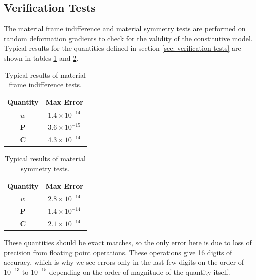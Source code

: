\documentclass[]{spie}  %
\newcommand\Tstrut{\rule{0pt}{2.6ex}}         %
\begin{document}
\subsection{Verification Tests}
The material frame indifference and material symmetry tests are performed on random deformation gradients to check for the validity of the constitutive model. Typical results for the quantities defined in section \ref{sec: verification tests} are shown in tables \ref{table: material frame indifference} and \ref{table: material symmetry}.

\begin{table}[h]
	\centering
	\caption{Typical results of material frame indifference tests.}
	\begin{tabular}{ | c | c | }
		\hline
		Quantity & Max Error \Tstrut \\ \hline
		$w$ 		& $1.4 \times 10^{-14}$ \Tstrut \\
		$\bm{P}$ 	& $3.6 \times 10^{-15}$ \\
		$\bm{C}$ 	& $4.3 \times 10^{-14}$ \\
		\hline
	\end{tabular}
	\label{table: material frame indifference}
\end{table}

\begin{table}[h]
	\centering
	\caption{Typical results of material symmetry tests.}
	\begin{tabular}{ | c | c | }
		\hline
		Quantity & Max Error \Tstrut \\ \hline
		$w$ 		& $2.8 \times 10^{-14}$ \Tstrut \\
		$\bm{P}$ 	& $1.4 \times 10^{-14}$ \\
		$\bm{C}$ 	& $2.1 \times 10^{-14}$ \\
		\hline
	\end{tabular}
	\label{table: material symmetry}
\end{table}

These quantities should be exact matches, so the only error here is due to loss of precision from floating point operations. These operations give 16 digits of accuracy, which is why we see errors only in the last few digits on the order of $10^{-13}$ to $10^{-15}$ depending on the order of magnitude of the quantity itself.  
\end{document}
